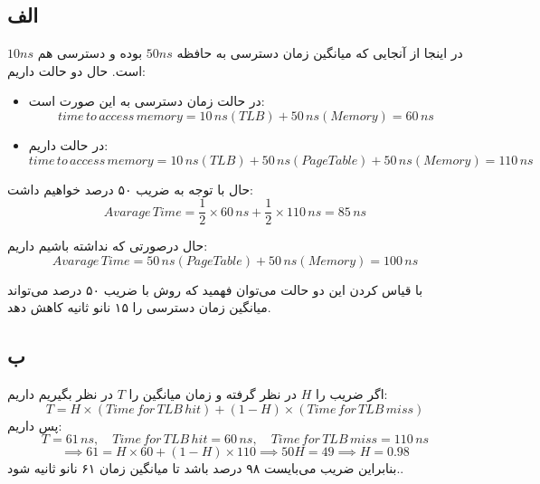 \subsection*{الف}
در اینجا از آنجایی که میانگین زمان دسترسی به حافظه 
$50ns$
بوده و دسترسی
هم
$10ns$
است. حال دو حالت داریم:
\begin{itemize}
    \item
    در حالت
    زمان دسترسی به این صورت است:
    \[
        time\,to\,access\,memory = 10\,ns(TLB) + 50\,ns(Memory) = 60\,ns    
    \]

    \item
    در حالت
    داریم:
    \[
        time\,to\,access\,memory = 10\,ns(TLB) + 50\,ns(Page Table) + 50\,ns(Memory) = 110\,ns    
    \]
\end{itemize}
حال با توجه به ضریب
۵۰ درصد خواهیم داشت:
\[
    Avarage\,Time = \frac{1}{2} \times 60\,ns + \frac{1}{2} \times 110\,ns = 85\,ns    
\]

حال درصورتی که
نداشته باشیم داریم:
\[
    Avarage\,Time = 50\,ns(Page Table) + 50\,ns(Memory) = 100\,ns   
\]

با قیاس کردن این دو حالت می‌توان فهمید که روش
با ضریب ۵۰ درصد می‌تواند میانگین زمان دسترسی را ۱۵ نانو ثانیه کاهش دهد.

\subsection*{ب}
اگر ضریب
را
$H$
در نظر گرفته و زمان میانگین را
$T$
در نظر بگیریم داریم:
\[
    T = H \times (Time\,for\,TLB\,hit)  + (1 - H) \times (Time\,for\,TLB\,miss)
\]
پس داریم:
\[
    T = 61\,ns, \quad Time\,for\,TLB\,hit = 60\,ns, \quad Time\,for\,TLB\,miss = 110\,ns
\]
\[
    \implies 61 = H \times 60 + (1 - H) \times 110 \implies 50 H = 49 \implies H = 0.98
\]
بنابراین ضریب
می‌بایست ۹۸ درصد باشد تا میانگین زمان ۶۱ نانو ثانیه شود..
